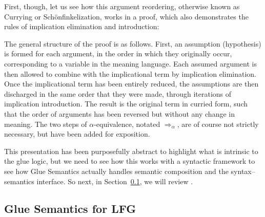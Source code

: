 First, though, let us see how this argument reordering, otherwise
known as Currying or Schönfinkelization, works in a
proof, which also demonstrates the rules of implication elimination
and introduction:
%
\begin{exe}
  \ex \label{ex:semantics-3}
\end{exe}

\noindent
The general structure of the proof is as follows. First, an assumption (hypothesis)
 is formed for each argument, in the order in which they
originally occur, corresponding to a variable in the meaning
language. Each assumed argument is then allowed to combine with the
implicational term by implication elimination. Once the implicational
term has been entirely reduced, the assumptions are then discharged in
the same order that they were made, through iterations of implication
introduction. The result is the original term in curried form, such
that the order of arguments has been reversed but without any change
in meaning. The two steps of $\alpha$-equivalence, notated
$\Rightarrow_\alpha$, are of course  not strictly
necessary, but have been added for exposition. 

This presentation has been purposefully abstract to highlight what is
intrinsic to the glue logic, but we  need to see how this
 works with a syntactic framework to see how Glue Semantics
actually handles semantic composition and the syntax--semantics interface. So next, in
Section~\ref{sec:glue-lfg}, we will review \lfgglue.

\subsection{Glue Semantics for LFG}
\label{sec:glue-lfg}

